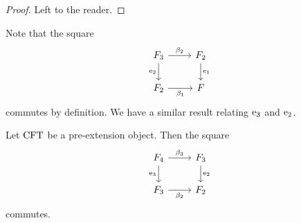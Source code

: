\begin{proof}
Left to the reader.
\end{proof}

\begin{comment}
\begin{proof}
It is straightforward to verify the equalities
\begin{align*}
\pullbackpr{1}{\ectxext}{\eft}\circ\beta_2\circ
  (\pullback{\pullbackpr{2}{\efamext}{\eft[2]}}{\pullbackpr{2}{\efamext}{\eft[2]}}{\efamext}{\eft[2]})
  & =
\pullbackpr{1}{\ectxext}{\eft}\circ\beta_2\circ\beta_3
  \\
\pullbackpr{2}{\ectxext}{\eft}\circ\beta_2\circ
  (\pullback{\pullbackpr{2}{\efamext}{\eft[2]}}{\pullbackpr{2}{\efamext}{\eft[2]}}{\efamext}{\eft[2]})
  & =
\pullbackpr{2}{\ectxext}{\eft}\circ\beta_2\circ\beta_3.\qedhere
\end{align*}
\end{proof}
\end{comment}

Note that the square
\begin{equation*}
\begin{tikzcd}
\stesysf_3
  \ar{r}{\beta_2}
  \ar{d}[swap]{\eext{2}}
  &
\stesysf_2
  \ar{d}{\efamext}
  \\
\stesysf_2
  \ar{r}[swap]{\beta_1}
  &
\stesysf
\end{tikzcd}
\end{equation*}
commutes by definition. We have a similar result relating $\mathrm{e}_{3}$ and
$\mathrm{e}_{2}$.

\begin{lem}
Let $\mathrm{CFT}$ be a pre-extension object. Then the square
\begin{equation*}
\begin{tikzcd}
\stesysf_4
  \ar{r}{\beta_3}
  \ar{d}[swap]{\eext{3}}
  &
\stesysf_3
  \ar{d}{\eext{2}}
  \\
\stesysf_3
  \ar{r}[swap]{\beta_2}
  &
\stesysf_2
\end{tikzcd}
\end{equation*}
commutes.
\end{lem}

